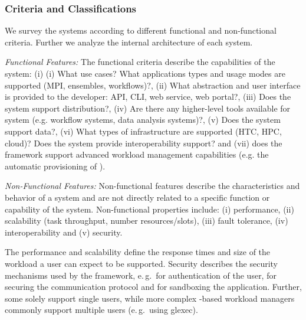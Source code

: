 \documentclass{sig-alternate}
\begin{document}
\subsubsection{Criteria and Classifications}

We survey the \pilotjob systems according to different 
functional and non-functional criteria. Further we analyze the internal 
architecture of each \pilotjob system.




\emph{Functional Features:}
The functional criteria describe the capabilities of the \pilotjob system: (i)
(i) What use cases? What applications types and usage modes are supported
(MPI, ensembles, workflows)?, (ii) What abstraction and user interface is
provided to the developer: API, CLI, web service, web portal?, (iii) Does the
\pilotjob system support distribution?, (iv) Are there any higher-level tools
available for \pilotjob system (e.g. workflow systems, data analysis
systems)?, (v) Does the \pilotjob system support data?, (vi) What types of
infrastructure are supported (HTC, HPC, cloud)? Does the \pilotjob system
provide interoperability support? and (vii) does the framework support 
advanced workload management capabilities (e.g. the automatic provisioning 
of \pilots).

\emph{Non-Functional Features:} Non-functional features describe the characteristics and behavior of a
\pilotjob system and are not directly related to a specific function or
capability of the \pilotjob system. Non-functional properties include: (i)
performance, (ii) scalability (task throughput, number resources/slots), (iii)
fault tolerance, (iv) interoperability and (v) security.

The performance and scalability define the response times and size of the
workload a user can expect to be supported. Security describes the security
mechanisms used by the framework, e.\,g.\ for authentication of the user, for
securing the communication protocol and for sandboxing the application.
Further, some \pilotjobs solely support single users, while more complex
\pilot-based workload managers commonly support multiple users (e.\,g.\ using
glexec).
\end{document}
